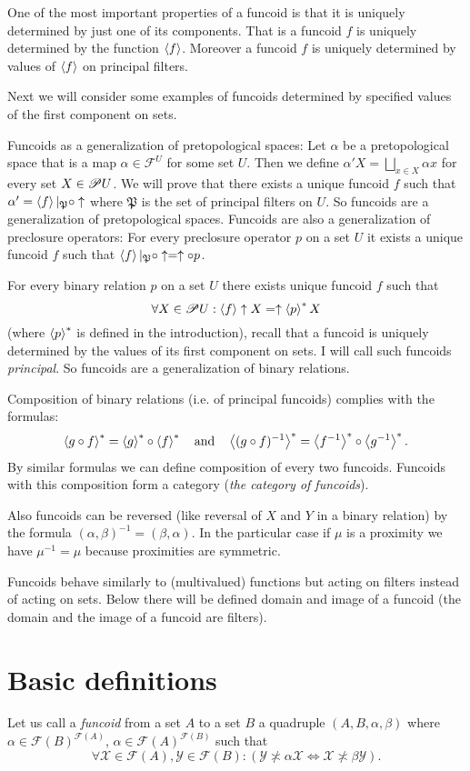 One of the most important properties of a funcoid is that it is uniquely
determined by just one of its components. That is a funcoid $f$ is
uniquely determined by the function $\left\langle f\right\rangle$. Moreover a funcoid
$f$ is uniquely determined by values of $\left\langle f\right\rangle$ on principal
filters.

Next we will consider some examples of funcoids determined by specified
values of the first component on sets.

Funcoids as a generalization of pretopological spaces: Let $\alpha$
be a pretopological space that is a map \emph{$\alpha\in\mathscr{F}^{ U}$}
for some set $ U$. Then we define $\alpha'X=\bigsqcup_{x\in X}\alpha x$
for every set $X\in\mathscr{P} U$. We will prove that there exists
a unique funcoid $f$ such that $\alpha'=\left\langle f\right\rangle|_{\mathfrak{P}}\circ\uparrow$
where $\mathfrak{P}$ is the set of principal filters on $ U$.
So funcoids are a generalization of pretopological spaces. Funcoids
are also a generalization of preclosure operators: For every preclosure
operator $p$ on a set $ U$ it exists a unique funcoid $f$ such
that $\left\langle f\right\rangle|_{\mathfrak{P}}\circ\uparrow=\uparrow\circ p$.

For every binary relation $p$ on a set $ U$ there exists unique
funcoid $f$ such that
\[
\forall X\in\mathscr{P} U:\left\langle f\right\rangle\uparrow X=\uparrow\left\langle p\right\rangle ^{\ast}X
\]
(where $\left\langle p\right\rangle ^{\ast}$ is defined in the introduction), recall that
a funcoid is uniquely determined by the values of its first component
on sets. I will call such funcoids \emph{principal}. So funcoids are
a generalization of binary relations.

Composition of binary relations (i.e. of principal funcoids) complies
with the formulas:
\[
\left\langle g\circ f\right\rangle ^{\ast}=\left\langle g\right\rangle ^{\ast}\circ\left\langle f\right\rangle ^{\ast}\quad\text{and}\quad\left\langle (g\circ
f)^{-1}\right\rangle ^{\ast}=\left\langle f^{-1}\right\rangle ^{\ast}\circ\left\langle g^{-1}\right\rangle ^{\ast}.
\]
By similar formulas we can define composition of every two funcoids.
Funcoids with this composition form a category (\emph{the category
of funcoids}).

Also funcoids can be reversed (like reversal of $X$ and $Y$ in a
binary relation) by the formula $(\alpha,\beta)^{-1}=(\beta,\alpha)$.
In the particular case if $\mu$ is a proximity we have $\mu^{-1}=\mu$
because proximities are symmetric.

Funcoids behave similarly to (multivalued) functions but acting on
filters instead of acting on sets. Below there will be defined domain
and image of a funcoid (the domain and the image of a funcoid are
filters).


\section{Basic definitions}
\begin{defn}
Let us call a \emph{funcoid} from a set $A$ to a
set $B$ a quadruple $(A,B,\alpha,\beta)$ where
$\alpha\in\mathscr{F}(B)^{\mathscr{F}(A)}$,
$\alpha\in\mathscr{F}(A)^{\mathscr{F}(B)}$ such that
\[
\forall\mathcal{X}\in\mathscr{F}(A),\mathcal{Y}\in\mathscr{F}(B):(\mathcal{Y}
\nasymp\alpha\mathcal{X}\Leftrightarrow\mathcal{X}\nasymp\beta\mathcal{Y}).
\]

\end{defn}

